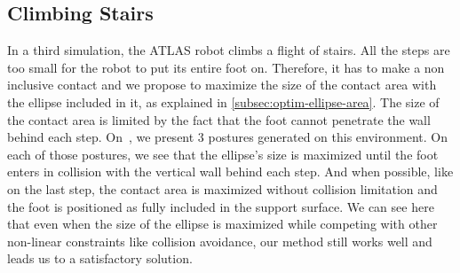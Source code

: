 %

\subsection{Climbing Stairs}
\label{subsec:smallStairs}

In a third simulation, the ATLAS robot climbs a flight of stairs.
All the steps are too small for the robot to put its entire foot on.
Therefore, it has to make a non inclusive contact and we propose to maximize the size of the contact area with the ellipse included in it, as explained in \ref{subsec:optim-ellipse-area}. 
The size of the contact area is limited by the fact that the foot cannot penetrate the wall behind each step.
On~, we present 3 postures generated on this environment.
On each of those postures, we see that the ellipse's size is maximized until the foot enters in collision with the vertical wall behind each step. And when possible, like on the last step, the contact area is maximized without collision limitation and the foot is positioned as fully included in the support surface.
We can see here that even when the size of the ellipse is maximized while competing with other non-linear constraints like collision avoidance, our method still works well and leads us to a satisfactory solution.


